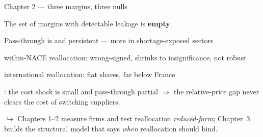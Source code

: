 \begin{frame}{Chapter 2 --- three margins, three nulls}

    \begin{tcolorbox}[colback=red!4,colframe=red!50!black]
        \centering The set of margins with detectable leakage is \textbf{empty}.
    \end{tcolorbox}

    \begin{wideitemize}
        \item[\alertg{1.}] Pass-through is  and persistent --- more in shortage-exposed sectors
        \item[\alertr{2.}]  within-NACE reallocation: wrong-signed, shrinks to insignificance, not robust
        \item[\alertr{3.}]  international reallocation: flat shares, far below France
    \end{wideitemize}

    \vspace{0.2cm}
    : the cost shock is small and pass-through partial $\Rightarrow$ the relative-price gap never clears the cost of switching suppliers.

    \vspace{0.1cm}
    {\color{dgray}\small $\hookrightarrow$ Chapters 1--2 measure firms and test reallocation \emph{reduced-form};
    Chapter~3 builds the structural model that says \emph{when} reallocation should bind.}

\end{frame}
